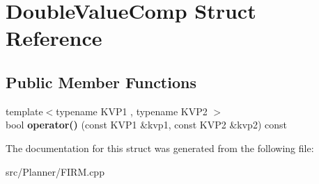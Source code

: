 \hypertarget{struct_double_value_comp}{}\section{Double\+Value\+Comp Struct Reference}
\label{struct_double_value_comp}
\subsection*{Public Member Functions}
\begin{DoxyCompactItemize}
\item 
\mbox{\label{struct_double_value_comp_ad006bf78092cd573750c57d7e6ece43f}} 
{\footnotesize template$<$typename K\+V\+P1 , typename K\+V\+P2 $>$ }\\bool {\bfseries operator()} (const K\+V\+P1 \&kvp1, const K\+V\+P2 \&kvp2) const
\end{DoxyCompactItemize}


The documentation for this struct was generated from the following file\+:\begin{DoxyCompactItemize}
\item 
src/\+Planner/F\+I\+R\+M.\+cpp\end{DoxyCompactItemize}
